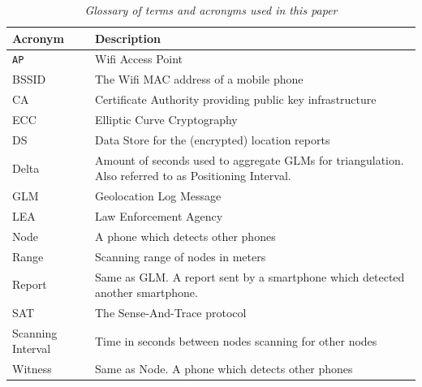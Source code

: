 \documentclass[10pt,titlepage]{article}
\begin{document}
\begin{table}[h]
\begin{tabular}{ m{3.55cm} | m{10.2cm} }
\textbf{Acronym} & \textbf{Description}\\
\hline \texttt{AP} & Wifi Access Point\\
BSSID & The Wifi MAC address of a mobile phone\\
CA & Certificate Authority providing public key infrastructure \\
ECC & Elliptic Curve Cryptography\\
DS & Data Store for the (encrypted) location reports\\
Delta & Amount of seconds used to aggregate GLMs for triangulation. Also referred to as Positioning Interval.\\
GLM & Geolocation Log Message\\
LEA & Law Enforcement Agency\\
Node & A phone which detects other phones\\
Range & Scanning range of nodes in meters \\
Report & Same as GLM. A report sent by a smartphone which detected another smartphone.\\
SAT & The Sense-And-Trace protocol \\
Scanning Interval & Time in seconds between nodes scanning for other nodes\\
Witness & Same as Node. A phone which detects other phones\\
\end{tabular}
\caption{\textit{Glossary of terms and acronyms used in this paper}}
\label{tab:glossary}
\end{table}





\end{document}
